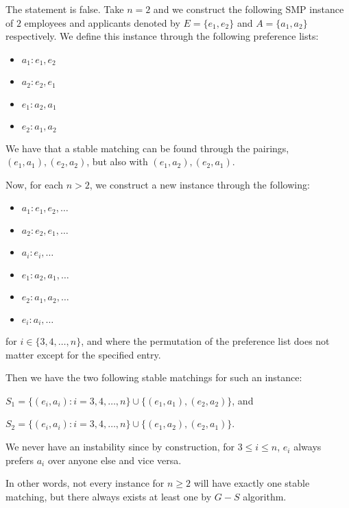 \documentclass[11pt,fleqn]{exam}
\newenvironment{soln}{\color{solnblue}}{}
\begin{document}
\begin{soln}
	The statement is false. Take \(n = 2\) and we construct the following SMP instance of \(2\) employees and applicants denoted by
	\(E = \{e_1, e_2\}\) and \(A = \{a_1, a_2\}\) respectively. We define this instance through the following preference lists:

	\begin{itemize}
		\item \(a_1 : e_1, e_2\)
		\item \(a_2 : e_2, e_1\)
		\item \(e_1 : a_2, a_1\)
		\item \(e_2 : a_1, a_2\)
	\end{itemize}

	We have that a stable matching can be found through the pairings, \((e_1, a_1), (e_2, a_2)\), but also with \((e_1, a_2), (e_2, a_1)\).

	Now, for each \(n > 2\), we construct a new instance through the following:

	\begin{itemize}
		\item \(a_1 : e_1, e_2, \dots\)
		\item \(a_2 : e_2, e_1, \dots\)
		\item \(a_i : e_i, \dots\)
		\item \(e_1 : a_2, a_1, \dots\)
		\item \(e_2 : a_1, a_2, \dots\)
		\item \(e_i : a_i, \dots\)
	\end{itemize}

	for \(i \in \{3, 4, \dots, n\}\), and where the permutation of the preference list does not matter except for the specified entry.

	Then we have the two following stable matchings for such an instance:

	\(S_1 = \{(e_i, a_i) : i = 3, 4, \dots, n\} \cup \{(e_1, a_1), (e_2, a_2)\}\), and

	\(S_2 = \{(e_i, a_i) : i = 3, 4, \dots, n\} \cup \{(e_1, a_2), (e_2, a_1)\}\).

	We never have an instability since by construction, for \(3 \leq i \leq n\), \(e_i\) always prefers \(a_i\) over anyone else and vice versa.

	In other words, not every instance for \(n \geq 2\) will have exactly one stable matching, but there always exists at least one by \(G-S\) algorithm.



\end{soln}
\end{document}
